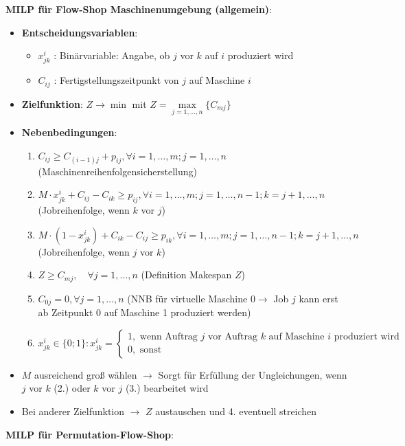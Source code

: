 \textbf{MILP für Flow-Shop Maschinenumgebung (allgemein)}:
\begin{itemize}
	\item \textbf{Entscheidungsvariablen}:
	\begin{itemize}
		\item $x_{jk}^{i}$ : Binärvariable: Angabe, ob $j$ vor $k$ auf $i$ produziert wird
		\item $C_{ij}$ : Fertigstellungszeitpunkt von $j$ auf Maschine $i$
	\end{itemize}
	\item \textbf{Zielfunktion}: $Z \rightarrow \min$ mit $Z=\max\limits_{j=1,\ldots,n}\{C_{mj}\}$
	\item \textbf{Nebenbedingungen}:
	\begin{enumerate}
		\item $C_{i j} \geq C_{(i-1) j}+p_{i j}, \forall i=1, \ldots, m ; j=1, \ldots, n$ (Maschinenreihenfolgensicherstellung)
		\item $M \cdot x_{j k}^{i}+C_{i j}-C_{i k} \geq p_{i j}, \forall i=1, \ldots, m ; j=1, \ldots, n-1 ; k=j+1, \ldots, n$ (Jobreihenfolge, wenn $k$ vor $j$)
		\item $M \cdot\left(1-x_{j k}^{i}\right)+C_{i k}-C_{i j} \geq p_{i k}, \forall i=1, \ldots, m ; j=1, \ldots, n-1 ; k=j+1, \ldots, n$ (Jobreihenfolge, wenn $j$ vor $k$)
		\item $Z \geq C_{m j}, \quad \forall j=1, \ldots, n$ (Definition Makespan $Z$)
		\item $C_{0 j}=0, \forall j=1, \ldots, n$ (NNB für virtuelle Maschine $0 \rightarrow$ Job $j$ kann erst ab Zeitpunkt 0 auf Maschine 1 produziert werden)
		\item $x_{j k}^{i} \in\{0 ; 1\}: x_{j k}^{i}=\left\{\begin{array}{l}1, \text { wenn Auftrag } j \text { vor Auftrag } k \text { auf Maschine } i \text{ produziert wird } \\ 0, \text { sonst }\end{array}\right.$
	\end{enumerate}
	\item $M$ ausreichend groß wählen $\rightarrow$ Sorgt für Erfüllung der Ungleichungen, wenn $j$ vor $k$ (2.) oder $k$ vor $j$ (3.) bearbeitet wird
	\item Bei anderer Zielfunktion $\rightarrow$ $Z$ austauschen und 4. eventuell streichen
\end{itemize}
\bigskip
\textbf{MILP für Permutation-Flow-Shop}:
